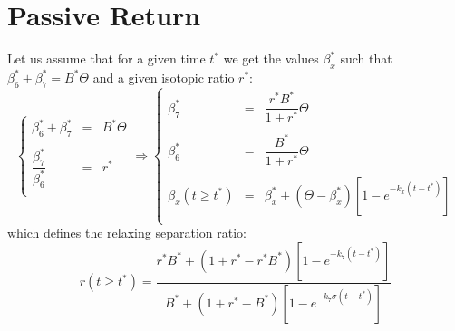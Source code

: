 \documentclass[aps,onecolumn,11pt]{revtex4}
\newcommand{\start}{\ast}
\begin{document}
\section{Passive Return}
Let us assume that for a given time $t^\start$ we get the values $\beta_x^\start$ such that $\beta_6^\start+\beta_7^\start=B^\start\Theta$ and a given isotopic ratio $r^\start$:
\begin{equation}
\label{eq:start}
\left\lbrace
\begin{array}{rcl}
\beta_6^\start+\beta_7^\start & = & B^\start\Theta \\
\\
\dfrac{\beta_7^\start}{\beta_6^\start} & = & r^\start\\
\end{array}
\right.
\Rightarrow
\left\lbrace
\begin{array}{rcl}
\beta_7^\start & = & \dfrac{r^\start B^\start}{1+r^\start}\Theta\\
\\
\beta_6^\start & = & \dfrac{B^\start}{1+r^\start}\Theta\\
\\
\beta_x(t\geq t^\start) & = & \beta_x^\start + \left(\Theta-\beta_x^\start\right)\left[1-e^{-k_x(t-t^\start)}\right]\\
\end{array}
\right.
\end{equation}
which defines the relaxing separation ratio:
\begin{equation}
	r(t\geq t^\start) = \dfrac
	{
		r^\start B^\start + ( 1+r^\start - r^\start B^\start) \left[1-e^{-k_7(t-t^\start)}\right]
	}
	{
		 B^\start + ( 1+r^\start -  B^\start) \left[1-e^{-k_7\sigma(t-t^\start)}\right]
	}
\end{equation}
\end{document}
